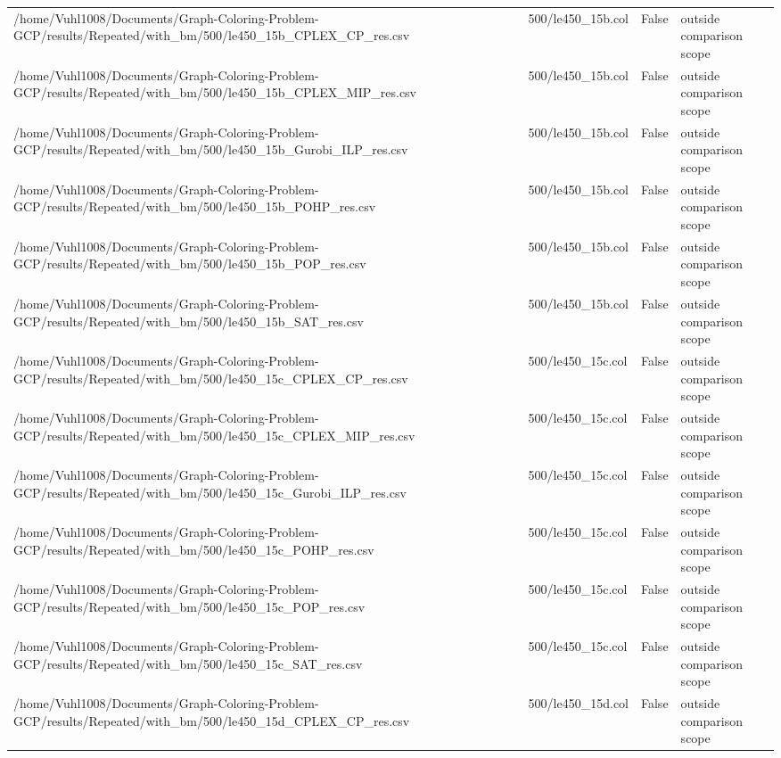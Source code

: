 \begin{table}[htbp]
\begin{tabular}{llll}
/home/Vuhl1008/Documents/Graph-Coloring-Problem-GCP/results/Repeated/with\_bm/500/le450\_15b\_CPLEX\_CP\_res.csv & 500/le450\_15b.col & False & outside comparison scope \\
/home/Vuhl1008/Documents/Graph-Coloring-Problem-GCP/results/Repeated/with\_bm/500/le450\_15b\_CPLEX\_MIP\_res.csv & 500/le450\_15b.col & False & outside comparison scope \\
/home/Vuhl1008/Documents/Graph-Coloring-Problem-GCP/results/Repeated/with\_bm/500/le450\_15b\_Gurobi\_ILP\_res.csv & 500/le450\_15b.col & False & outside comparison scope \\
/home/Vuhl1008/Documents/Graph-Coloring-Problem-GCP/results/Repeated/with\_bm/500/le450\_15b\_POHP\_res.csv & 500/le450\_15b.col & False & outside comparison scope \\
/home/Vuhl1008/Documents/Graph-Coloring-Problem-GCP/results/Repeated/with\_bm/500/le450\_15b\_POP\_res.csv & 500/le450\_15b.col & False & outside comparison scope \\
/home/Vuhl1008/Documents/Graph-Coloring-Problem-GCP/results/Repeated/with\_bm/500/le450\_15b\_SAT\_res.csv & 500/le450\_15b.col & False & outside comparison scope \\
/home/Vuhl1008/Documents/Graph-Coloring-Problem-GCP/results/Repeated/with\_bm/500/le450\_15c\_CPLEX\_CP\_res.csv & 500/le450\_15c.col & False & outside comparison scope \\
/home/Vuhl1008/Documents/Graph-Coloring-Problem-GCP/results/Repeated/with\_bm/500/le450\_15c\_CPLEX\_MIP\_res.csv & 500/le450\_15c.col & False & outside comparison scope \\
/home/Vuhl1008/Documents/Graph-Coloring-Problem-GCP/results/Repeated/with\_bm/500/le450\_15c\_Gurobi\_ILP\_res.csv & 500/le450\_15c.col & False & outside comparison scope \\
/home/Vuhl1008/Documents/Graph-Coloring-Problem-GCP/results/Repeated/with\_bm/500/le450\_15c\_POHP\_res.csv & 500/le450\_15c.col & False & outside comparison scope \\
/home/Vuhl1008/Documents/Graph-Coloring-Problem-GCP/results/Repeated/with\_bm/500/le450\_15c\_POP\_res.csv & 500/le450\_15c.col & False & outside comparison scope \\
/home/Vuhl1008/Documents/Graph-Coloring-Problem-GCP/results/Repeated/with\_bm/500/le450\_15c\_SAT\_res.csv & 500/le450\_15c.col & False & outside comparison scope \\
/home/Vuhl1008/Documents/Graph-Coloring-Problem-GCP/results/Repeated/with\_bm/500/le450\_15d\_CPLEX\_CP\_res.csv & 500/le450\_15d.col & False & outside comparison scope \\

\end{tabular}
\end{table}
